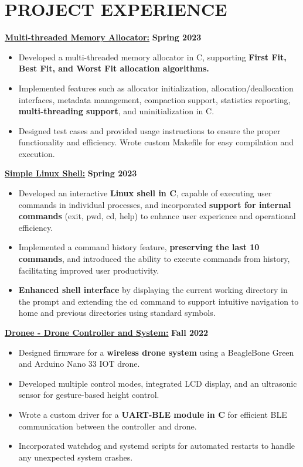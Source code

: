 \documentclass[letterpaper,11pt]{article}
\newcommand{\Item} [1] {
    \item\small{{#1 \vspace{-2pt}}}
}
\newcommand{\resumeItemListStart} [0] {
    \vspace{2pt}
    \begin{itemize}[topsep=0pt,itemsep=-2pt]
}
\newcommand{\resumeItemListEnd} [0] {
    \end{itemize}
    \vspace{5pt}
}
\begin{document}
    \section{PROJECT EXPERIENCE}
    \href{https://github.com/SatireSage/Multi-threaded-Memory-Allocator}{{\color{colorValue}} \underline{\textbf{Multi-threaded Memory Allocator:}}} \hfill \textbf{Spring 2023}
    \resumeItemListStart{}
        \Item{Developed a multi-threaded memory allocator in C, supporting \textbf{First Fit, Best Fit, and Worst Fit allocation algorithms.}}
        \Item{Implemented features such as allocator initialization, allocation/deallocation interfaces, metadata management, compaction support, statistics reporting,  \textbf{multi-threading support}, and uninitialization in C.}
        \Item{Designed test cases and provided usage instructions to ensure the proper functionality and efficiency. Wrote custom Makefile for easy compilation and execution.}
    \resumeItemListEnd{}
    \href{https://github.com/SatireSage/Simple-Linux-Shell}{{\color{colorValue}} \underline{\textbf{Simple Linux Shell:}}} \hfill \textbf{Spring 2023}
    \resumeItemListStart{}
        \Item{Developed an interactive \textbf{Linux shell in C}, capable of executing user commands in individual processes, and incorporated \textbf{support for internal commands} (exit, pwd, cd, help) to enhance user experience and operational efficiency.}
        \Item{Implemented a command history feature, \textbf{preserving the last 10 commands}, and introduced the ability to execute commands from history, facilitating improved user productivity.}
        \Item{\textbf{Enhanced shell interface} by displaying the current working directory in the prompt and extending the cd command to support intuitive navigation to home and previous directories using standard symbols.}
    \resumeItemListEnd{}
    \href{https://github.com/SatireSage/Dronee}{{\color{colorValue}} \underline{\textbf{Dronee - Drone Controller and System:}}} \hfill \textbf{Fall 2022}
    \resumeItemListStart{}
        \Item{Designed firmware for a \textbf{wireless drone system} using a BeagleBone Green and Arduino Nano 33 IOT drone.}
        \Item{Developed multiple control modes, integrated LCD display, and an ultrasonic sensor for gesture-based height control.}
        \Item{Wrote a custom driver for a \textbf{UART-BLE module in C} for efficient BLE communication between the controller and drone.}
        \Item{Incorporated watchdog and systemd scripts for automated restarts to handle any unexpected system crashes.}
    \resumeItemListEnd{}
\end{document}

